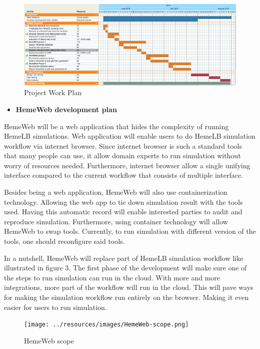 \documentclass[]{article}
\providecommand{\tightlist}{%
  \setlength{\itemsep}{0pt}\setlength{\parskip}{0pt}}
\begin{document}
\begin{figure}[H]
\centering
\includegraphics{../resources/images/workplan.png}
\caption{Project Work Plan}
\end{figure}

\begin{itemize}
\tightlist
\item
  \textbf{HemeWeb development plan}
\end{itemize}

HemeWeb will be a web application that hides the complexity of running
HemeLB simulations. Web application will enable users to do HemeLB
simulation workflow via internet browser. Since internet browser is such
a standard tools that many people can use, it allow domain experts to
run simulation without worry of resources needed. Furthermore, internet
browser allow a single unifying interface compared to the current
workflow that consists of multiple interface.

Besides being a web application, HemeWeb will also use containerization
technology. Allowing the web app to tie down simulation result with the
tools used. Having this automatic record will enable interested parties
to audit and reproduce simulation. Furthermore, using container
technology will allow HemeWeb to swap tools. Currently, to run
simulation with different version of the tools, one should reconfigure
said tools.

In a nutshell, HemeWeb will replace part of HemeLB simulation workflow
like illustrated in figure 3. The first phase of the development will
make sure one of the steps to run simulation can run in the cloud. With
more and more integrations, more part of the workflow will run in the
cloud. This will pave ways for making the simulation workflow run
entirely on the browser. Making it even easier for users to run
simulation.

\begin{figure}[H]
\centering
\texttt{[image: ../resources/images/HemeWeb-scope.png]}
\caption{HemeWeb scope}
\end{figure}
\end{document}
